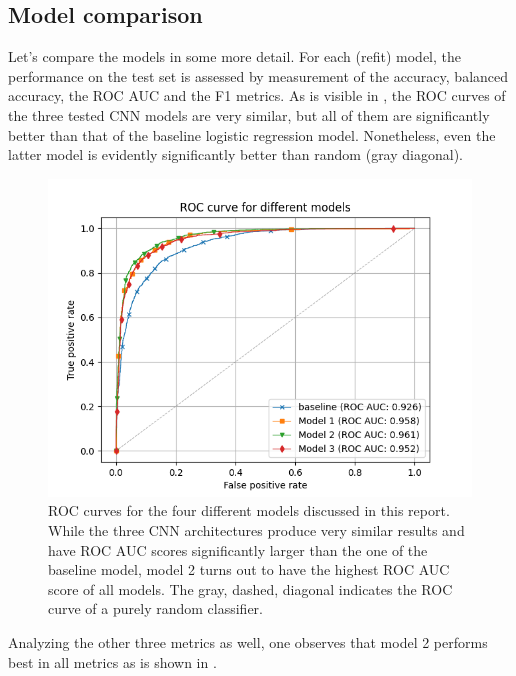 \documentclass{article}
\begin{document}
\subsection{Model comparison}
Let's compare the models in some more detail. For each (refit) model, the performance on the test set is assessed by measurement of the accuracy, balanced accuracy, the ROC AUC and the F1 metrics. As is visible in , the ROC curves of the three tested CNN models are very similar, but all of them are significantly better than that of the baseline logistic regression model. Nonetheless, even the latter model is evidently significantly better than random (gray diagonal). 
\begin{figure}[t!]
  \centering
  \includegraphics[width=\textwidth]{imgs/roc_curve_comparison.png}
  \caption{ROC curves for the four different models discussed in this report. While the three CNN architectures produce very similar results and have ROC AUC scores significantly larger than the one of the baseline model, model 2 turns out to have the highest ROC AUC score of all models. The gray, dashed, diagonal indicates the ROC curve of a purely random classifier.}
  \label{fig:roccurve}
\end{figure}

Analyzing the other three metrics as well, one observes that model 
2 performs best in all metrics as is shown in . 
\end{document}
